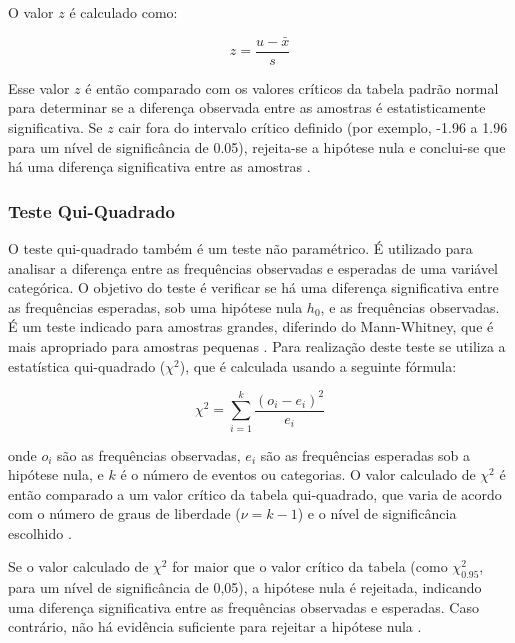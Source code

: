 O valor \(z\) é calculado como:

\[
z = \frac{u - \bar{x}}{s}
\]

Esse valor \(z\) é então comparado com os valores críticos da tabela padrão normal para determinar se a diferença observada entre as amostras é estatisticamente significativa. Se \(z\) cair fora do intervalo crítico definido (por exemplo, -1.96 a 1.96 para um nível de significância de 0.05), rejeita-se a hipótese nula e conclui-se que há uma diferença significativa entre as amostras \cite{juristo_basics_2001}.

\subsubsection{Teste Qui-Quadrado}
\label{subsec:chi-square}

O teste qui-quadrado também é um teste não paramétrico. É utilizado para analisar a diferença entre as frequências observadas e esperadas de uma variável categórica. O objetivo do teste é verificar se há uma diferença significativa entre as frequências esperadas, sob uma hipótese nula \(h_0\), e as frequências observadas. É um teste indicado para amostras grandes, diferindo do Mann-Whitney, que é mais apropriado para amostras pequenas \cite{juristo_basics_2001}. Para realização deste teste se utiliza a estatística qui-quadrado (\(\chi^2\)), que é calculada usando a seguinte fórmula:

\[
\chi^2 = \sum_{i=1}^{k} \frac{(o_i - e_i)^2}{e_i}
\]

onde \(o_i\) são as frequências observadas, \(e_i\) são as frequências esperadas sob a hipótese nula, e \(k\) é o número de eventos ou categorias. O valor calculado de \(\chi^2\) é então comparado a um valor crítico da tabela qui-quadrado, que varia de acordo com o número de graus de liberdade (\(\nu = k - 1\)) e o nível de significância escolhido \cite{juristo_basics_2001}.

Se o valor calculado de \(\chi^2\) for maior que o valor crítico da tabela (como \(\chi^2_{0.95}\), para um nível de significância de 0,05), a hipótese nula é rejeitada, indicando uma diferença significativa entre as frequências observadas e esperadas. Caso contrário, não há evidência suficiente para rejeitar a hipótese nula \cite{juristo_basics_2001}.

